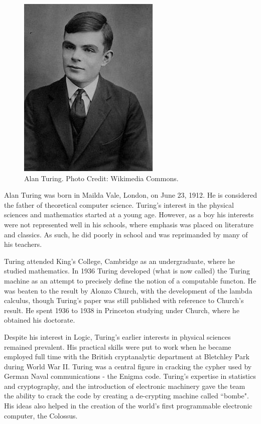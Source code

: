\documentclass[../../../include/open-logic-section]{subfiles}
\begin{document}
\begin{figure}[h!] 
\centering 
\includegraphics[scale=0.75]{alan-turing.jpg}
\caption{Alan Turing. Photo Credit: Wikimedia Commons.} 
\end{figure}

Alan Turing was born in Mailda Vale, London, on June 23, 1912. He is
considered the father of theoretical computer science. Turing's interest in
the physical sciences and mathematics started at a young age. However, as a
boy his interests were not represented well in his schools, where emphasis
was placed on literature and classics. As such, he did poorly in school and
was reprimanded by many of his teachers.

Turing attended King's College, Cambridge as an undergraduate, where he
studied mathematics. In 1936 Turing developed (what is now called) the
Turing machine as an attempt to precisely define the notion of a computable
functon. He was beaten to the result by Alonzo Church, with the development
of the lambda calculus, though Turing's paper was still published with
reference to Church's result. He spent 1936 to 1938 in Princeton studying
under Church, where he obtained his doctorate.

Despite his interest in Logic, Turing's earlier interests in physical
sciences remained prevalent. His practical skills were put to work when he
became employed full time with the British cryptanalytic department at
Bletchley Park during World War II. Turing was a central figure in cracking
the cypher used by German Naval communications - the Enigma code. 
 Turing's expertise in statistics and cryptography, and the introduction of electronic
machinery gave the team the ability to crack the code by creating a 
de-crypting machine called ``bombe". His ideas also helped in the creation
of the world's first programmable electronic computer, the Colossus.
\end{document}
